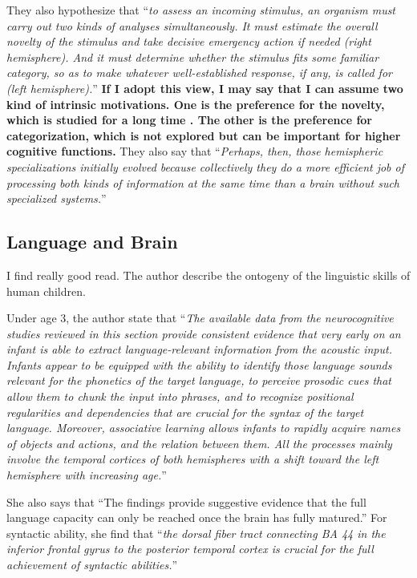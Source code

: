 \documentclass[12pt]{article}
\begin{document}
They also hypothesize that ``\textit{to assess an incoming stimulus, an organism must carry out two kinds of analyses simultaneously. 
It must estimate the overall novelty of the stimulus and take decisive emergency action
if needed (right hemisphere). And it must determine whether the stimulus fits some familiar category, 
so as to make whatever well-established response, if any, is called for (left hemisphere).}'' 
\textbf{If I adopt this view, I may say that I can assume two kind of intrinsic motivations. 
One is the preference for the novelty, which is studied for a long time \cite{Schmidhuber10}. 
The other is the preference for categorization, which is not explored but can be important for 
higher cognitive functions.} They also say that ``\textit{Perhaps, then, those hemispheric specializations 
initially evolved because collectively they do a more efficient job of processing both kinds
of information at the same time than a brain without such specialized systems.}'' 

\subsection{Language and Brain}
I find \cite{Friederici17} really good read. The author describe the ontogeny of the 
linguistic skills of human children. 

Under age 3, the author state that 
``\textit{The available data from the neurocognitive studies reviewed in this section provide consistent
evidence that very early on an infant is able to extract language-relevant information
from the acoustic input. Infants appear to be equipped with the ability to identify those
language sounds relevant for the phonetics of the target language, to perceive prosodic cues
that allow them to chunk the input into phrases, and to recognize positional regularities and
dependencies that are crucial for the syntax of the target language. Moreover, associative
learning allows infants to rapidly acquire names of objects and actions, and the relation
between them. All the processes mainly involve the temporal cortices of both hemispheres
with a shift toward the left hemisphere with increasing age.}''

She also says that ``The findings provide suggestive evidence that the full
language capacity can only be reached once the brain has fully matured.'' For syntactic ability, 
she find that ``\textit{the dorsal fiber tract
connecting BA 44 in the inferior frontal gyrus to the posterior temporal cortex is crucial for
the full achievement of syntactic abilities.}'' 
\end{document}
